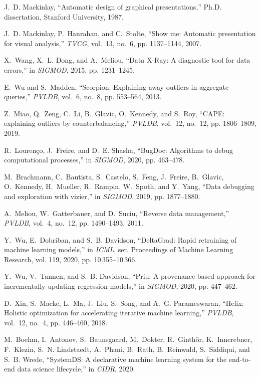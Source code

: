 \documentclass[11pt,dvipsnames]{article}
\begin{document}
\begin{thebibliography}{10}
J.~D. Mackinlay, ``Automatic design of graphical presentations,'' Ph.D.
  dissertation, Stanford University, 1987.

J.~D. Mackinlay, P.~Hanrahan, and C.~Stolte, ``Show me: Automatic presentation
  for visual analysis,'' \emph{TVCG}, vol.~13, no.~6, pp. 1137--1144, 2007.

X.~Wang, X.~L. Dong, and A.~Meliou, ``Data {X}-{R}ay: {A} diagnostic tool for
  data errors,'' in \emph{SIGMOD}, 2015, pp. 1231--1245.

E.~Wu and S.~Madden, ``Scorpion: Explaining away outliers in aggregate
  queries,'' \emph{PVLDB}, vol.~6, no.~8, pp. 553--564, 2013.

Z.~Miao, Q.~Zeng, C.~Li, B.~Glavic, O.~Kennedy, and S.~Roy, ``{CAPE:}
  explaining outliers by counterbalancing,'' \emph{PVLDB}, vol.~12, no.~12, pp.
  1806--1809, 2019.

R.~Louren{\c{c}}o, J.~Freire, and D.~E. Shasha, ``Bug{D}oc: Algorithms to debug
  computational processes,'' in \emph{SIGMOD}, 2020, pp. 463--478.

M.~Brachmann, C.~Bautista, S.~Castelo, S.~Feng, J.~Freire, B.~Glavic,
  O.~Kennedy, H.~Mueller, R.~Rampin, W.~Spoth, and Y.~Yang, ``Data debugging
  and exploration with vizier,'' in \emph{SIGMOD}, 2019, pp. 1877--1880.

A.~Meliou, W.~Gatterbauer, and D.~Suciu, ``Reverse data management,''
  \emph{PVLDB}, vol.~4, no.~12, pp. 1490--1493, 2011.

Y.~Wu, E.~Dobriban, and S.~B. Davidson, ``Delta{G}rad: Rapid retraining of
  machine learning models,'' in \emph{ICML}, ser. Proceedings of Machine
  Learning Research, vol. 119, 2020, pp. 10\,355--10\,366.

Y.~Wu, V.~Tannen, and S.~B. Davidson, ``Priu: {A} provenance-based approach for
  incrementally updating regression models,'' in \emph{SIGMOD}, 2020, pp.
  447--462.

D.~Xin, S.~Macke, L.~Ma, J.~Liu, S.~Song, and A.~G. Parameswaran, ``Helix:
  Holistic optimization for accelerating iterative machine learning,''
  \emph{PVLDB}, vol.~12, no.~4, pp. 446--460, 2018.

M.~Boehm, I.~Antonov, S.~Baunsgaard, M.~Dokter, R.~Ginth{\"{o}}r,
  K.~Innerebner, F.~Klezin, S.~N. Lindstaedt, A.~Phani, B.~Rath, B.~Reinwald,
  S.~Siddiqui, and S.~B. Wrede, ``System{DS}: {A} declarative machine learning
  system for the end-to-end data science lifecycle,'' in \emph{CIDR}, 2020.


\end{thebibliography}
\end{document}
